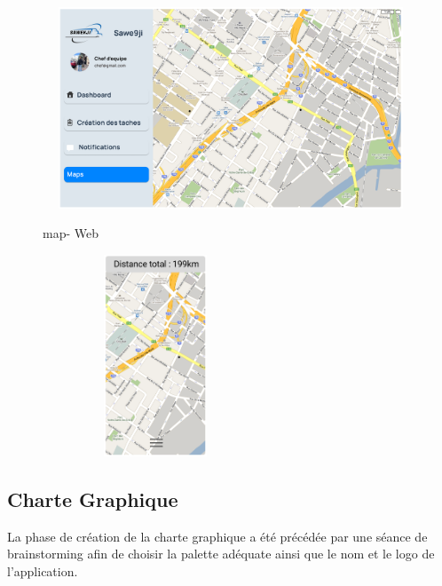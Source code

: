 \begin{figure}[h!]
  \centering
  \begin{minipage}[t]{0.60\textwidth}
    \centering
    \includegraphics[width=1\textwidth, height=6cm]{chap2.images/maps web.png}
    \caption{map- Web}
  \end{minipage}
  \hfill
  \begin{minipage}[t]{0.38\textwidth}
    \centering
    \includegraphics[width=0.6\textwidth, height=6cm]{chap2.images/map mobile.png}
    \caption{}
  \end{minipage}
\end{figure}



\newpage
\subsection{Charte Graphique}

La phase de création de la charte graphique a été précédée par une séance de brainstorming afin de choisir la palette adéquate ainsi que le nom et le logo de l’application.

